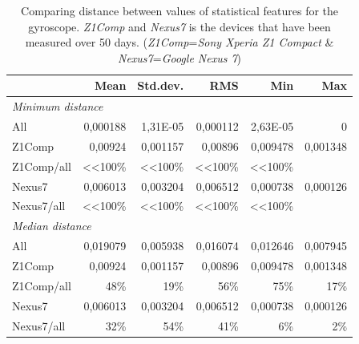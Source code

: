 \begin{table}[htbp]
  \centering
    \begin{tabular}{lrrrrr}
    \toprule
          & Mean  & Std.dev. & RMS   & Min   & Max \\
    \toprule
    \multicolumn{6}{l}{\textit{Minimum distance}} \\
    All   & 0,000188 & 1,31E-05 & 0,000112 & 2,63E-05 & 0 \\
    Z1Comp & 0,00924 & 0,001157 & 0,00896 & 0,009478 & 0,001348 \\
    Z1Comp/all & <<100\% & <<100\% & <<100\% & <<100\% &  \\
    Nexus7 & 0,006013 & 0,003204 & 0,006512 & 0,000738 & 0,000126 \\
    Nexus7/all & <<100\% & <<100\% & <<100\% & <<100\% &  \\
    \midrule
    \multicolumn{6}{l}{\textit{Median distance}} \\
    All   & 0,019079 & 0,005938 & 0,016074 & 0,012646 & 0,007945 \\
    Z1Comp & 0,00924 & 0,001157 & 0,00896 & 0,009478 & 0,001348 \\
    Z1Comp/all & 48\%  & 19\%  & 56\%  & 75\%  & 17\% \\
    Nexus7 & 0,006013 & 0,003204 & 0,006512 & 0,000738 & 0,000126 \\
    Nexus7/all & 32\%  & 54\%  & 41\%  & 6\%   & 2\% \\ \midrule
    \bottomrule
    \end{tabular}%
    \caption{Comparing distance between values of statistical features for the gyroscope. \textit{Z1Comp} and \textit{Nexus7} is the devices that have been measured over 50 days. (\textit{Z1Comp}=\textit{Sony Xperia Z1 Compact} \& \textit{Nexus7}=\textit{Google Nexus 7})}
  \label{tab:featureGyro}%
\end{table}%
